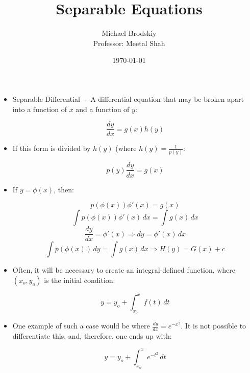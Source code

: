 \documentclass[12pt]{article}
\title{Separable Equations}
\date{\today}
\author{Michael Brodskiy\\ \small Professor: Meetal Shah}
\begin{document}
\maketitle

\begin{itemize}

  \item Separable Differential $-$ A differential equation that may be broken apart into a function of $x$ and a function of $y$:

    $$\frac{dy}{dx}=g(x)h(y)$$

  \item If this form is divided by $h(y)$ (where $h(y)=\frac{1}{p(y)}$:

      $$p(y)\frac{dy}{dx}=g(x)$$

  \item If $y=\phi(x)$, then:

    $$p(\phi(x))\phi'(x)=g(x)$$
    $$\int p(\phi(x))\phi'(x)\,dx=\int g(x)\,dx$$
    $$\frac{dy}{dx}=\phi'(x)\Rightarrow dy=\phi'(x)\,dx$$
    $$\int p(\phi(x))\,dy=\int g(x)\,dx\Rightarrow H(y)=G(x)+c$$

  \item Often, it will be necessary to create an integral-defined function, where $(x_o,y_o)$ is the initial condition:

    $$y=y_o+\int_{x_o}^xf(t)\,dt$$

  \item One example of such a case would be where $\frac{dy}{dx}=e^{-x^2}$. It is not possible to differentiate this, and, therefore, one ends up with:

    $$y=y_o+\int_{x_o}^xe^{-t^2}\,dt$$

\end{itemize}
\end{document}

